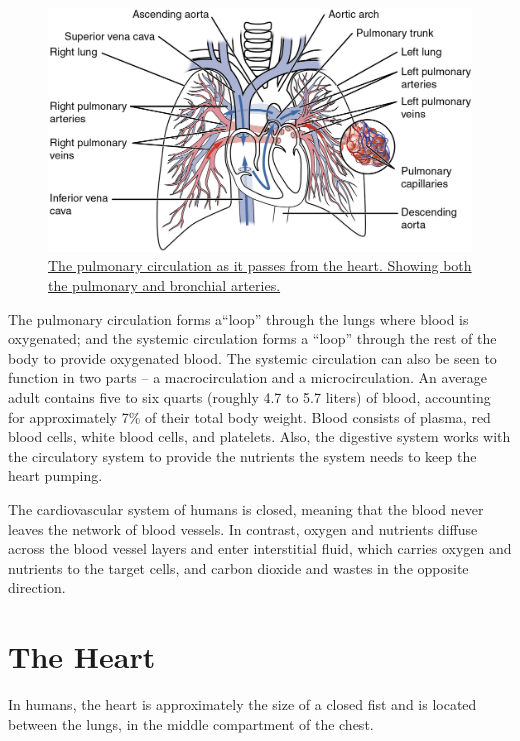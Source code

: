 \begin{figure}

{\centering \includegraphics[width=0.7\linewidth]{./figures/circulation/2119_Pulmonary_Circuit} 

}

\caption{\href{https://commons.wikimedia.org/wiki/File:2119_Pulmonary_Circuit.jpg}{The pulmonary circulation as it passes from the heart. Showing both the pulmonary and bronchial arteries.}}\label{fig:pulmonarycirculation}
\end{figure}

The pulmonary circulation forms a``loop'' through the lungs where blood is oxygenated; and the systemic circulation forms a ``loop'' through the rest of the body to provide oxygenated blood. The systemic circulation can also be seen to function in two parts -- a macrocirculation and a microcirculation. An average adult contains five to six quarts (roughly 4.7 to 5.7 liters) of blood, accounting for approximately 7\% of their total body weight. Blood consists of plasma, red blood cells, white blood cells, and platelets. Also, the digestive system works with the circulatory system to provide the nutrients the system needs to keep the heart pumping.

The cardiovascular system of humans is closed, meaning that the blood never leaves the network of blood vessels. In contrast, oxygen and nutrients diffuse across the blood vessel layers and enter interstitial fluid, which carries oxygen and nutrients to the target cells, and carbon dioxide and wastes in the opposite direction.

\hypertarget{the-heart}{%
\section{The Heart}\label{the-heart}}

In humans, the heart is approximately the size of a closed fist and is located between the lungs, in the middle compartment of the chest.

